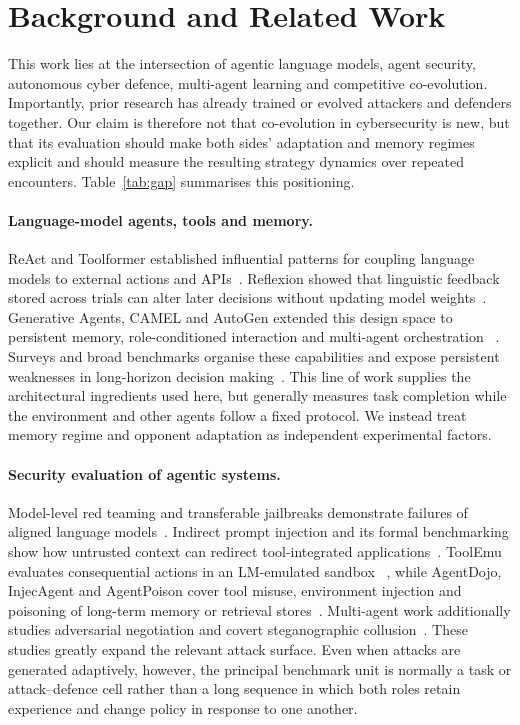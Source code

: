 \section{Background and Related Work}
\label{sec:related}

This work lies at the intersection of agentic language models, agent
security, autonomous cyber defence, multi-agent learning and competitive
co-evolution. Importantly, prior research has already trained or evolved
attackers and defenders together. Our claim is therefore not that
co-evolution in cybersecurity is new, but that its evaluation should make
both sides' adaptation and memory regimes explicit and should measure the
resulting strategy dynamics over repeated encounters. Table~\ref{tab:gap}
summarises this positioning.

\paragraph{Language-model agents, tools and memory.}
ReAct and Toolformer established influential patterns for coupling language
models to external actions and APIs~\cite{yao2023react,schick2023toolformer}.
Reflexion showed that linguistic feedback stored across trials can alter later
decisions without updating model weights~\cite{shinn2023reflexion}. Generative
Agents, CAMEL and AutoGen extended this design space to persistent memory,
role-conditioned interaction and multi-agent orchestration
~\cite{park2023generative,li2023camel,wu2023autogen}. Surveys and broad
benchmarks organise these capabilities and expose persistent weaknesses in
long-horizon decision making~\cite{xi2025rise,liu2024agentbench}. This line of
work supplies the architectural ingredients used here, but generally measures
task completion while the environment and other agents follow a fixed
protocol. We instead treat memory regime and opponent adaptation as
independent experimental factors.

\paragraph{Security evaluation of agentic systems.}
Model-level red teaming and transferable jailbreaks demonstrate failures of
aligned language models~\cite{perez2022red,zou2023universal}. Indirect prompt
injection and its formal benchmarking show how untrusted context can redirect
tool-integrated applications~\cite{greshake2023not,liu2024formalizing}.
ToolEmu evaluates consequential actions in an LM-emulated sandbox
~\cite{ruan2024toolemu}, while AgentDojo, InjecAgent and AgentPoison cover tool
misuse, environment injection and poisoning of long-term memory or retrieval
stores~\cite{debenedetti2024agentdojo,zhan2024injecagent,chen2024agentpoison}.
Multi-agent work additionally studies adversarial negotiation and covert
steganographic collusion~\cite{abdelnabi2024cooperation,motwani2024secret}.
These studies greatly expand the relevant attack surface. Even when attacks
are generated adaptively, however, the principal benchmark unit is normally a
task or attack--defence cell rather than a long sequence in which both roles
retain experience and change policy in response to one another.

